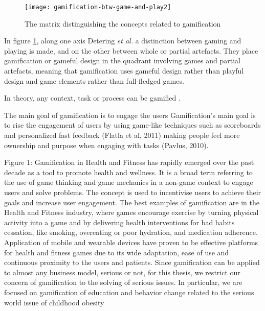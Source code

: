 \begin{figure}[h]
    \centering
    \texttt{[image: gamification-btw-game-and-play2]}
    \caption{The matrix distinguishing the concepts related to gamification}
    \label{fig:mesh1}
\end{figure}
In figure \ref{fig:mesh1}, along one axis Detering \textit{et al.} a distinction between gaming and playing is made, and on the other between whole or partial artefacts. They place gamification or gameful design in the quadrant involving games and partial artefacts, meaning that gamification uses gameful design rather than playful design and game elements rather than full-fledged games. 
 
 
% 

In theory, any context, task or process can be gamified \cite{muntean2011raising}. %

The main goal of gamification is to engage the users 
Gamification’s main goal is to rise the engagement of users by using game-like techniques such as
scoreboards and personalized fast feedback (Flatla et al, 2011) making people feel more ownership
and purpose when engaging with tasks (Pavlus, 2010). 
\cite{burke2016gamify}

Figure 1: 
Gamification in Health and Fitness has rapidly emerged over the past decade as a tool to promote health and wellness. It is a broad term referring to the use of game thinking and game mechanics in a non-game context to engage users and solve problems. The concept is used to incentivise users to achieve their goals and increase user engagement. The best examples of gamification are in the Health and Fitness industry, where games encourage exercise by turning physical activity into a game and by delivering health interventions for bad habits cessation, like smoking, overeating or poor hydration, and medication adherence. Application of mobile and wearable devices have proven to be effective platforms for health and fitness games due to its wide adaptation, ease of use and continuous proximity to the users and patients.
Since gamification can be applied to almost any business model, serious or not,
for this thesis, we restrict our concern of gamification to the solving of serious issues. In
particular, we are focused on gamification of education and behavior change related to the
serious world issue of childhood obesity
